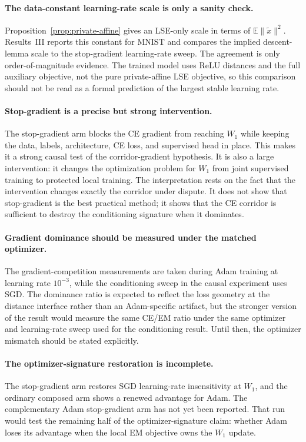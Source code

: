 \paragraph{The data-constant learning-rate scale is only a sanity check.}
Proposition~\ref{prop:private-affine} gives an LSE-only scale in terms of
$\mathbb{E}\|\tilde{x}\|^2$. Results~III reports this constant for MNIST and
compares the implied descent-lemma scale to the stop-gradient learning-rate
sweep. The agreement is only order-of-magnitude evidence. The trained model
uses ReLU distances and the full auxiliary objective, not the pure
private-affine LSE objective, so this comparison should not be read as a
formal prediction of the largest stable learning rate.

\paragraph{Stop-gradient is a precise but strong intervention.}
The stop-gradient arm blocks the CE gradient from reaching $W_1$ while keeping
the data, labels, architecture, CE loss, and supervised head in place. This
makes it a strong causal test of the corridor-gradient hypothesis. It is also
a large intervention: it changes the optimization problem for $W_1$ from joint
supervised training to protected local training. The interpretation rests on
the fact that the intervention changes exactly the corridor under dispute. It
does not show that stop-gradient is the best practical method; it shows that
the CE corridor is sufficient to destroy the conditioning signature when it
dominates.

\paragraph{Gradient dominance should be measured under the matched optimizer.}
The gradient-competition measurements are taken during Adam training at
learning rate $10^{-3}$, while the conditioning sweep in the causal experiment
uses SGD. The dominance ratio is expected to reflect the loss geometry at the
distance interface rather than an Adam-specific artifact, but the stronger
version of the result would measure the same CE/EM ratio under the same
optimizer and learning-rate sweep used for the conditioning result. Until
then, the optimizer mismatch should be stated explicitly.

\paragraph{The optimizer-signature restoration is incomplete.}
The stop-gradient arm restores SGD learning-rate insensitivity at $W_1$, and
the ordinary composed arm shows a renewed advantage for Adam. The
complementary Adam stop-gradient arm has not yet been reported. That run would
test the remaining half of the optimizer-signature claim: whether Adam loses
its advantage when the local EM objective owns the $W_1$ update.

